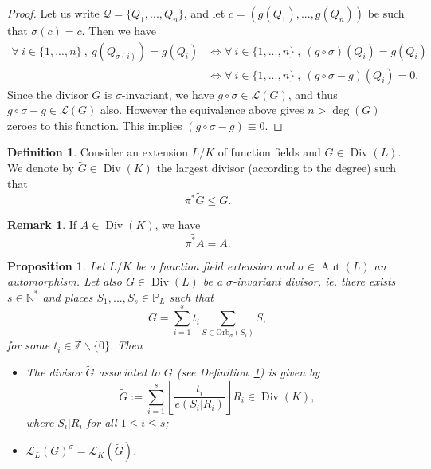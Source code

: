 \documentclass[10pt]{article}
\newtheorem{prop1}[thm]{Proposition}
\theoremstyle{definition}
\newtheorem{rq1}[thm]{Remark}
\theoremstyle{definition}
\theoremstyle{definition}
\newtheorem{def1}[thm]{Definition}
\newcommand{\N}{\mathbb{N}}
\newcommand{\Z}{\mathbb{Z}}
\newcommand{\PP}{\mathbb{P}}
\newcommand{\QR}{\mathcal{Q}}
\newcommand{\Div}{\operatorname{Div}}
\newcommand{\Aut}{\operatorname{Aut}}
\newcommand{\calL}{\mathcal{L}}
\begin{document}
\begin{proof}
Let us write $\QR = \{Q_1,...,Q_n\}$, and let $c=(g(Q_1),...,g(Q_n))$ be such that $\sigma(c)=c$. Then we have 
\begin{align*}
\forall \ i \in \{1,...,n\} \ , \ g(Q_{\sigma(i)}) = g(Q_i) &\iff \forall \ i \in \{1,...,n\} \ , \ (g \circ \sigma)(Q_i) =g(Q_i) \\
& \iff \forall \ i \in \{1,...,n\} \ , \ (g\circ \sigma - g)(Q_i) = 0.
\end{align*}
Since the divisor $G$ is $\sigma$-invariant, we have $g \circ \sigma \in \calL(G)$, and thus $g\circ \sigma - g \in \calL(G)$ also.
However the equivalence above gives $n>\deg(G)$ zeroes to this function. This implies $(g \circ \sigma - g) \equiv 0$.
\end{proof}

\begin{def1} \label{pousseavant}
Consider an extension $L/K$ of function fields and $G \in \Div(L)$. We denote by $\tilde{G} \in \Div(K)$ the largest divisor (according to the degree) such that
\[\pi^*\tilde{G} \leq G.\]
\end{def1} 
 
\begin{rq1} \label{jsp}
If $A \in \Div(K)$, we have 
\[\widetilde{\pi^*A}=A.\]
\end{rq1}

\begin{prop1} \label{invrr}
Let $L/K$ be a function field extension and $\sigma \in \Aut(L)$ an automorphism. Let also $G \in \Div(L)$ be a $\sigma$-invariant divisor, \textit{ie.} there exists $s \in \N^*$ and places $S_1,...,S_s \in \PP_L$ such that 
\[G = \sum\limits_{i=1}^s t_i \sum\limits_{S \in \mathrm{Orb}_{\sigma}(S_i)} S,\]
for some $t_i \in \Z \backslash \{0\}$. Then
\begin{itemize}
\item[(i)] The divisor $\tilde{G}$ associated to $G$ (see Definition~\ref{pousseavant}) is given by
\[\tilde{G}:= \sum\limits_{i=1}^s \left\lfloor\dfrac{t_i}{e(S_i|R_i)}\right\rfloor  R_i \in \Div(K),\]
where $S_i|R_i$ for all $1 \leq i \leq s$;
\item[(ii)]  $\calL_L(G)^{\sigma} = \calL_K(\tilde{G})$.
\end{itemize}
\end{prop1}
\end{document}
